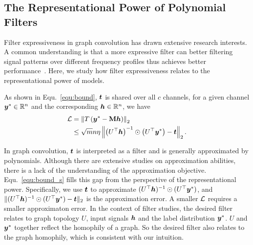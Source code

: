 \documentclass{article} %
\begin{document}
\subsection{The Representational Power of Polynomial Filters}
Filter expressiveness in graph convolution has drawn extensive research interests.
A common understanding is that a more expressive filter can better filtering signal patterns over different frequency profiles thus achieves better performance~\citep{chien2021adaptive,he2021bernnet,JacobiConv,yang2022spectrum,bo2022specformer}.
Here, we study how filter expressiveness relates to the representational power of models.

As shown in Equ.~\ref{equ:bound}, ${\bm{t}}$ is shared over all $c$ channels, for a given channel ${\bm{y}}^*\in{\mathbb{R}}^n$ and the corresponding ${\bm{h}}\in{\mathbb{R}}^n$, we have
\begin{equation}
	\label{equ:bound_s}
	\begin{aligned}
		{\mathcal{L}}&=\left\|T\left({\bm{y}}^*-{\mathbf{M}}{\bm{h}}\right)\right\|_2\\
		&\leq\sqrt{m}n\eta\left\|\left(U^{\top}{\bm{h}}\right)^{-1}\odot\left(U^{\top}{\bm{y}}^*\right)-{\bm{t}}\right\|_2.
	\end{aligned}
\end{equation}

In graph convolution, ${\bm{t}}$ is interpreted as a filter and is generally approximated by polynomials.
Although there are extensive studies on approximation abilities, there is a lack of the understanding of the approximation objective.
Equ.~\ref{equ:bound_s} fills this gap from the perspective of the representational power.
Specifically, we use ${\bm{t}}$ to approximate $(U^{\top}{\bm{h}})^{-1}\odot(U^{\top}{\bm{y}}^*)$, and $\|(U^{\top}{\bm{h}})^{-1}\odot(U^{\top}{\bm{y}}^*)-{\bm{t}}\|_2$ is the approximation error.
A smaller ${\mathcal{L}}$ requires a smaller approximaton error.
In the context of filter studies, the desired filter relates to graph topology $U$, input signals ${\bm{h}}$ and the label distribution ${\bm{y}}^*$.
$U$ and ${\bm{y}}^*$ together reflect the homophily of a graph.
So the desired filter also relates to the graph homophily, which is consistent with our intuition.
\end{document}
